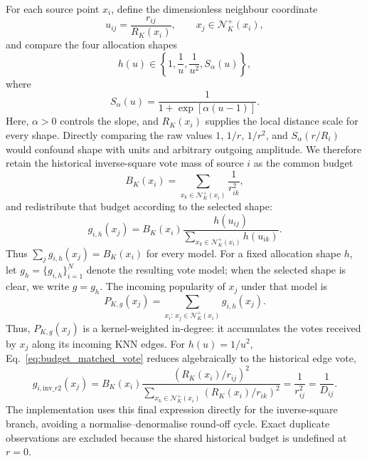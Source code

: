 \documentclass[pdflatex,sn-mathphys-num]{sn-jnl}
\newcommand{\calN}{\mathcal{N}}
\begin{document}
For each source point $x_i$, define the dimensionless neighbour coordinate
\begin{equation}
u_{ij}=\frac{r_{ij}}{R_K(x_i)},
\qquad x_j\in\calN_K^+(x_i),
\label{eq:normalised_neighbour_distance}
\end{equation}
and compare the four allocation shapes
\begin{equation}
h(u)\in
\left\{
1,\frac{1}{u},\frac{1}{u^2},S_\alpha(u)
\right\},
\label{eq:vote_kernel_family}
\end{equation}
where
\begin{equation}
S_\alpha(u)=\frac{1}{1+\exp[\alpha(u-1)]}.
\label{eq:sigmoid_vote}
\end{equation}
Here, $\alpha>0$ controls the slope, and $R_K(x_i)$ supplies the local distance scale for every shape.  Directly comparing the raw values $1$, $1/r$, $1/r^2$, and $S_\alpha(r/R_i)$ would confound shape with units and arbitrary outgoing amplitude.  We therefore retain the historical inverse-square vote mass of source $i$ as the common budget
\begin{equation}
B_K(x_i)=\sum_{x_k\in\calN_K^+(x_i)}\frac{1}{r_{ik}^2},
\label{eq:historical_source_budget}
\end{equation}
and redistribute that budget according to the selected shape:
\begin{equation}
g_{i,h}(x_j)=B_K(x_i)
\frac{h(u_{ij})}
{\displaystyle\sum_{x_k\in\calN_K^+(x_i)}h(u_{ik})}.
\label{eq:budget_matched_vote}
\end{equation}
Thus $\sum_j g_{i,h}(x_j)=B_K(x_i)$ for every model.  For a fixed
allocation shape $h$, let $g_h=\{g_{i,h}\}_{i=1}^{N}$ denote the resulting
vote model; when the selected shape is clear, we write $g=g_h$.  The incoming
popularity of $x_j$ under that model is
\begin{equation}
P_{K,g}(x_j)=
\sum_{x_i:\,x_j\in\calN_K^+(x_i)}g_{i,h}(x_j).
\label{eq:reverse_popularity}
\end{equation}
Thus, $P_{K,g}(x_j)$ is a kernel-weighted in-degree: it accumulates the
votes received by $x_j$ along its incoming KNN edges.
For $h(u)=1/u^2$, Eq.~\eqref{eq:budget_matched_vote} reduces algebraically to the historical edge vote,
\begin{equation}
g_{i,\mathrm{inv}\_r2}(x_j)
=B_K(x_i)\frac{(R_K(x_i)/r_{ij})^2}
{\sum_{x_k\in\calN_K^+(x_i)}(R_K(x_i)/r_{ik})^2}
=\frac{1}{r_{ij}^2}=\frac{1}{D_{ij}}.
\label{eq:historical_reverse_popularity}
\end{equation}
The implementation uses this final expression directly for the inverse-square branch, avoiding a normalise--denormalise round-off cycle. Exact duplicate observations are excluded because the shared historical budget is undefined at $r=0$.
\end{document}
